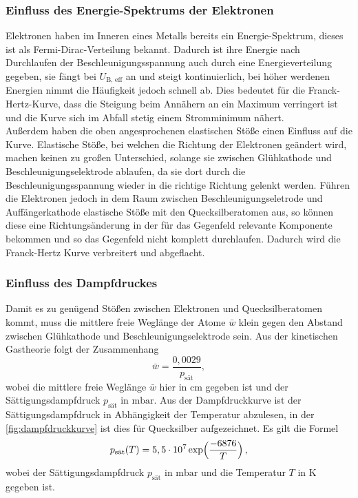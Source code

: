     \subsubsection{Einfluss des Energie-Spektrums der Elektronen}

        Elektronen haben im Inneren eines Metalls bereits ein Energie-Spektrum, dieses ist als Fermi-Dirac-Verteilung bekannt. Dadurch ist ihre Energie nach 
        Durchlaufen der Beschleunigungsspannung auch durch eine Energieverteilung gegeben, sie fängt bei $U_{\text{B, eff}}$ an und steigt kontinuierlich, bei 
        höher werdenen Energien nimmt die Häufigkeit jedoch schnell ab. Dies bedeutet für die Franck-Hertz-Kurve, dass die Steigung beim Annähern an ein Maximum 
        verringert ist und die Kurve sich im Abfall stetig einem Stromminimum nähert. \\

        \noindent Außerdem haben die oben angesprochenen elastischen Stöße einen Einfluss auf die Kurve. Elastische Stöße, bei welchen die Richtung der Elektronen 
        geändert wird, machen keinen zu großen Unterschied, solange sie zwischen Glühkathode und Beschleunigungselektrode ablaufen, da sie dort durch die 
        Beschleunigungsspannung wieder in die richtige Richtung gelenkt werden. Führen die Elektronen jedoch in dem Raum zwischen Beschleunigungseletrode und 
        Auffängerkathode elastische Stöße mit den Quecksilberatomen aus, so können diese eine Richtungsänderung in der für das Gegenfeld relevante Komponente 
        bekommen und so das Gegenfeld nicht komplett durchlaufen. Dadurch wird die Franck-Hertz Kurve verbreitert und abgeflacht. 

    \subsubsection{Einfluss des Dampfdruckes}

        Damit es zu genügend Stößen zwischen Elektronen und Quecksilberatomen kommt, muss die mittlere freie Weglänge der Atome $\bar{w}$ klein gegen den Abstand zwischen 
        Glühkathode und Beschleunigungselektrode sein. Aus der kinetischen Gastheorie folgt der Zusammenhang
        \begin{equation}\label{eqn:w_bar}
            \bar{w} = \frac{0,0029}{p_{\text{sät}}}, 
        \end{equation}
        wobei die mittlere freie Weglänge $\bar{w}$ hier in $\si{\centi\metre}$ gegeben ist und der Sättigungsdampfdruck $p_{\text{sät}}$ in $\si{\milli\bar}$. 
        Aus der Dampfdruckkurve ist der Sättigungsdampfdruck in Abhängigkeit der Temperatur abzulesen, in der \autoref{fig:dampfdruckkurve} ist dies für 
        Quecksilber aufgezeichnet. Es gilt die Formel 
        \begin{equation}\label{eqn:p_sat}
            p_{\text{sät}}(T) = 5,5 \cdot 10^7 \exp\Bigl(\frac{-6876}{T} \Bigr) \, , 
        \end{equation}
        wobei der Sättigungsdampfdruck $p_{\text{sät}}$ in $\si{\milli\bar}$ und die Temperatur $T$ in $\si{\kelvin}$ gegeben ist. 


